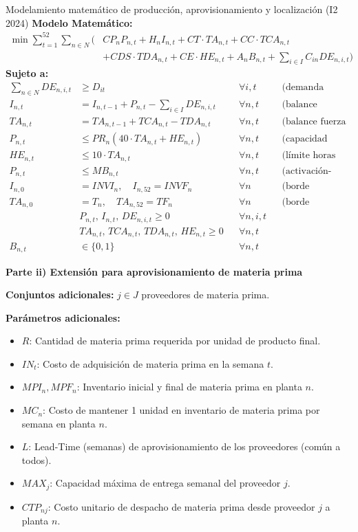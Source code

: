 \begin{ejercicio}{Modelamiento matemático de producción, aprovisionamiento y localización (I2 2024)}
\textbf{Modelo Matemático:}
\begin{align*}
  \min \sum_{t=1}^{52} \sum_{n \in N} \Big( &CP_n P_{n,t} + H_n I_{n,t} + CT \cdot TA_{n,t} + CC \cdot TCA_{n,t} \\
  &+ CDS \cdot TDA_{n,t} + CE \cdot HE_{n,t} + A_n B_{n,t} + \sum_{i\in I} C_{in} DE_{n,i,t} \Big)
\end{align*}
\textbf{Sujeto a:}
\begin{align*}
  \sum_{n \in N} DE_{n,i,t} &\ge D_{it} && \forall i, t && \text{(demanda cliente)}\\
  I_{n,t} &= I_{n,t-1} + P_{n,t} - \sum_{i \in I} DE_{n,i,t} && \forall n, t && \text{(balance inventario PT)}\\
  TA_{n,t} &= TA_{n,t-1} + TCA_{n,t} - TDA_{n,t} && \forall n, t && \text{(balance fuerza labor)}\\
  P_{n,t} &\le PR_n \left( 40 \cdot TA_{n,t} + HE_{n,t} \right) && \forall n, t && \text{(capacidad laboral)}\\
  HE_{n,t} &\le 10 \cdot TA_{n,t} && \forall n, t && \text{(límite horas extra)}\\
  P_{n,t} &\le M B_{n,t} && \forall n, t && \text{(activación-producción)}\\
  I_{n,0} &= INVI_n, \quad I_{n,52} = INVF_n && \forall n && \text{(borde inventario)}\\
  TA_{n,0} &= T_n, \quad TA_{n,52} = TF_n && \forall n && \text{(borde trabajadores)}\\
  & P_{n,t},\, I_{n,t},\, DE_{n,i,t} \ge 0 && \forall n, i, t \\
  & TA_{n,t},\, TCA_{n,t},\, TDA_{n,t},\, HE_{n,t} \ge 0 && \forall n, t \\
  B_{n,t} &\in \{0,1\} && \forall n, t
\end{align*}

\textbf{Parte ii) Extensión para aprovisionamiento de materia prima}

\textbf{Conjuntos adicionales:} $j \in J$ proveedores de materia prima.

\textbf{Parámetros adicionales:}
\begin{itemize}[leftmargin=1.4em, itemsep=0pt]
  \item $R$: Cantidad de materia prima requerida por unidad de producto final.
  \item $IN_t$: Costo de adquisición de materia prima en la semana $t$.
  \item $MPI_n, MPF_n$: Inventario inicial y final de materia prima en planta $n$.
  \item $MC_n$: Costo de mantener 1 unidad en inventario de materia prima por semana en planta $n$.
  \item $L$: Lead-Time (semanas) de aprovisionamiento de los proveedores (común a todos).
  \item $MAX_j$: Capacidad máxima de entrega semanal del proveedor $j$.
  \item $CTP_{nj}$: Costo unitario de despacho de materia prima desde proveedor $j$ a planta $n$.
\end{itemize}


\end{ejercicio}
